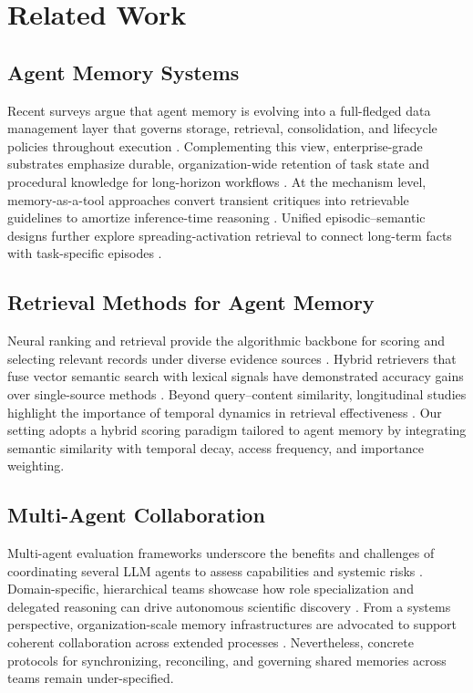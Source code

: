 \section{Related Work}

\subsection{Agent Memory Systems}
Recent surveys argue that agent memory is evolving into a full-fledged data management layer that governs storage, retrieval, consolidation, and lifecycle policies throughout execution \citep{zhou2026we}. Complementing this view, enterprise-grade substrates emphasize durable, organization-wide retention of task state and procedural knowledge for long-horizon workflows \citep{alake2026oracle}. At the mechanism level, memory-as-a-tool approaches convert transient critiques into retrievable guidelines to amortize inference-time reasoning \citep{gallego2026distilling}. Unified episodic–semantic designs further explore spreading-activation retrieval to connect long-term facts with task-specific episodes \citep{jiang2026synapse}.

\subsection{Retrieval Methods for Agent Memory}
Neural ranking and retrieval provide the algorithmic backbone for scoring and selecting relevant records under diverse evidence sources \citep{trabelsi2021neural}. Hybrid retrievers that fuse vector semantic search with lexical signals have demonstrated accuracy gains over single-source methods \citep{sawarkar2024blended,steffens2026vstash}. Beyond query–content similarity, longitudinal studies highlight the importance of temporal dynamics in retrieval effectiveness \citep{ovcharov2026temporal}. Our setting adopts a hybrid scoring paradigm tailored to agent memory by integrating semantic similarity with temporal decay, access frequency, and importance weighting.

\subsection{Multi-Agent Collaboration}
Multi-agent evaluation frameworks underscore the benefits and challenges of coordinating several LLM agents to assess capabilities and systemic risks \citep{rasheed2024large}. Domain-specific, hierarchical teams showcase how role specialization and delegated reasoning can drive autonomous scientific discovery \citep{rothfarb2025hierarchic}. From a systems perspective, organization-scale memory infrastructures are advocated to support coherent collaboration across extended processes \citep{alake2026oracle}. Nevertheless, concrete protocols for synchronizing, reconciling, and governing shared memories across teams remain under-specified.

